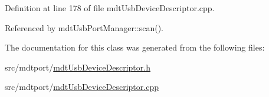 Definition at line 178 of file mdt\-Usb\-Device\-Descriptor.\-cpp.



Referenced by mdt\-Usb\-Port\-Manager\-::scan().



The documentation for this class was generated from the following files\-:\begin{DoxyCompactItemize}
\item 
src/mdtport/\hyperlink{mdt_usb_device_descriptor_8h}{mdt\-Usb\-Device\-Descriptor.\-h}\item 
src/mdtport/\hyperlink{mdt_usb_device_descriptor_8cpp}{mdt\-Usb\-Device\-Descriptor.\-cpp}\end{DoxyCompactItemize}
